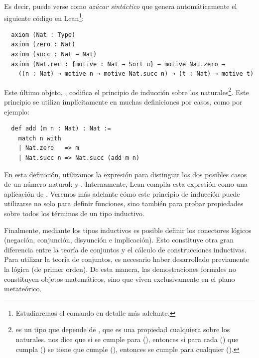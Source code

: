 Es decir,  puede verse como \textit{azúcar sintáctico} que genera automáticamente el siguiente código en Lean\footnote{Estudiaremos el comando  en detalle más adelante.}:

\begin{lstlisting}
  axiom (Nat : Type)
  axiom (zero : Nat)
  axiom (succ : Nat → Nat)
  axiom (Nat.rec : {motive : Nat → Sort u} → motive Nat.zero →
    ((n : Nat) → motive n → motive Nat.succ n) → (t : Nat) → motive t)
\end{lstlisting}

Este último objeto, , codifica el principio de inducción sobre los naturales\footnote{ es un tipo que depende de , que es una propiedad cualquiera sobre los naturales.  nos dice que si se cumple  para  (), entonces si para cada  () que cumpla  () se tiene que  cumple  (), entonces se cumple  para cualquier  ().}. Este principio se utiliza implícitamente en muchas definiciones por casos, como por ejemplo:

\begin{lstlisting}
  def add (m n : Nat) : Nat :=
    match n with
    | Nat.zero   => m
    | Nat.succ n => Nat.succ (add m n)
\end{lstlisting}

\newpage

En esta definición, utilizamos la expresión  para distinguir los dos posibles casos de un número natural:  y . Internamente, Lean compila esta expresión como una aplicación de . Veremos más adelante cómo este principio de inducción puede utilizarse no solo para definir funciones, sino también para probar propiedades sobre todos los términos de un tipo inductivo.

Finalmente, mediante los tipos inductivos es posible definir los conectores lógicos (negación, conjunción, disyunción e implicación). Esto constituye otra gran diferencia entre la teoría de conjuntos y el cálculo de construcciones inductivas. Para utilizar la teoría de conjuntos, es necesario haber desarrollado previamente la lógica (de primer orden). De esta manera, las demostraciones formales no constituyen objetos matemáticos, sino que viven exclusivamente en el plano metateórico.

